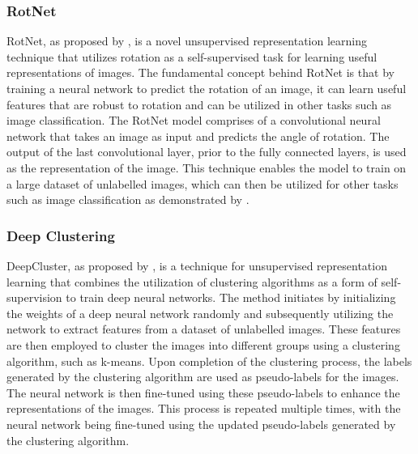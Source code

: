 \subsubsection{RotNet}
\label{subsubsec:RotNet}
RotNet, as proposed by \cite{gidaris2018unsupervised}, is a novel unsupervised representation learning technique that utilizes rotation as a self-supervised task for learning useful representations of images. The fundamental concept behind RotNet is that by training a neural network to predict the rotation of an image, it can learn useful features that are robust to rotation and can be utilized in other tasks such as image classification. The RotNet model comprises of a convolutional neural network that takes an image as input and predicts the angle of rotation. The output of the last convolutional layer, prior to the fully connected layers, is used as the representation of the image. This technique enables the model to train on a large dataset of unlabelled images, which can then be utilized for other tasks such as image classification as demonstrated by \cite{zhou2021preservational}.

\subsubsection{Deep Clustering}
\label{subsubsec:deep_clustering}
DeepCluster, as proposed by \cite{caron2018deep}, is a technique for unsupervised representation learning that combines the utilization of clustering algorithms as a form of self-supervision to train deep neural networks. The method initiates by initializing the weights of a deep neural network randomly and subsequently utilizing the network to extract features from a dataset of unlabelled images. These features are then employed to cluster the images into different groups using a clustering algorithm, such as k-means. Upon completion of the clustering process, the labels generated by the clustering algorithm are used as pseudo-labels for the images. The neural network is then fine-tuned using these pseudo-labels to enhance the representations of the images. This process is repeated multiple times, with the neural network being fine-tuned using the updated pseudo-labels generated by the clustering algorithm.


